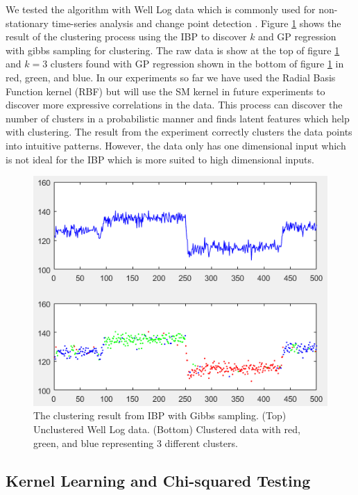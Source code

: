 \documentclass{article}
\begin{document}
We tested the algorithm with Well Log data which is commonly used for non-stationary time-series analysis and change point detection \cite{WellLog}. Figure \ref{IBPClust} shows the result of the clustering process using the IBP to discover $k$ and GP regression with gibbs sampling for clustering. The raw data is show at the top of figure \ref{IBPClust} and $k=3$ clusters found with GP regression shown in the bottom of figure \ref{IBPClust} in red, green, and blue. In our experiments so far we have used the Radial Basis Function kernel (RBF) but will use the SM kernel in future experiments to discover more expressive correlations in the data. This process can discover the number of clusters in a probabilistic manner and finds latent features which help with clustering. The result from the experiment correctly clusters the data points into intuitive patterns. However, the data only has one dimensional input which is not ideal for the IBP which is more suited to high dimensional inputs. 

\begin{figure}[ht]
\vskip 0.2in
\begin{center}
\centerline{\includegraphics[width=\columnwidth]{IBPClust}}
\caption{The clustering result from IBP with Gibbs sampling. (Top) Unclustered Well Log data. (Bottom) Clustered data with red, green, and blue representing 3 different clusters.}
\label{IBPClust}
\end{center}
\vskip -0.2in
\end{figure} 


\subsection{Kernel Learning and Chi-squared Testing}
\end{document}
